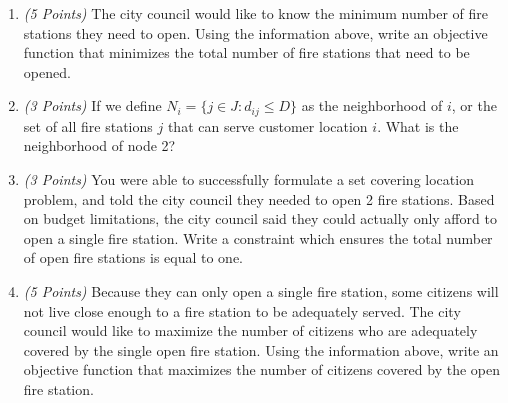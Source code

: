 \documentclass[10pt]{article}
\newcommand{\points}[1]{{\it (#1 Points)}}
\begin{document}
\begin{enumerate}
\item \points{5} The city council would like to know the minimum number of fire stations they need to open.  Using the information above, write an objective function that minimizes the total number of fire stations that need to be opened.

\vspace{0.4cm}
\vfill

\item \points{3} If we define $N_i = \{ j \in J: d_{ij} \leq D \}$ as the neighborhood of $i$, or the set of all fire stations $j$ that can serve customer location $i$.  What is the neighborhood of node 2?
  \vfill


\newpage

\item \points{3} You were able to successfully formulate a set covering location problem, and told the city council they needed to open 2 fire stations.  Based on budget limitations, the city council said they could actually only afford to open a single fire station.  Write a constraint which ensures the total number of open fire stations is equal to one.

  \vfill

\item \points{5} Because they can only open a single fire station, some citizens will not live close enough to a fire station to be adequately served.  The city council would like to maximize the number of citizens who are adequately covered by the single open fire station.  Using the information above, write an objective function that maximizes the number of citizens covered by the open fire station.

  \vfill

\end{enumerate}
\end{document}
